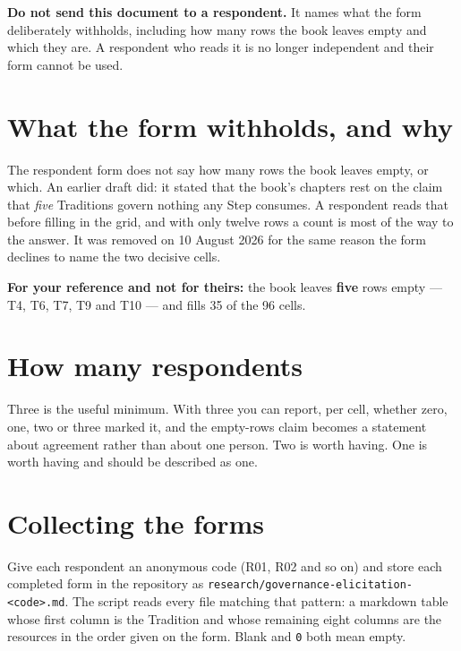 \documentclass[11pt]{article}
\begin{document}

\begin{warning}
\textbf{Do not send this document to a respondent.} It names what the form deliberately withholds,
including how many rows the book leaves empty and which they are. A respondent who reads it is no
longer independent and their form cannot be used.
\end{warning}

\section{What the form withholds, and why}

The respondent form does not say how many rows the book leaves empty, or which. An earlier draft
did: it stated that the book's chapters rest on the claim that \textit{five} Traditions govern
nothing any Step consumes. A respondent reads that before filling in the grid, and with only
twelve rows a count is most of the way to the answer. It was removed on 10 August 2026 for the
same reason the form declines to name the two decisive cells.

\begin{note}
\textbf{For your reference and not for theirs:} the book leaves \textbf{five} rows empty --- T4,
T6, T7, T9 and T10 --- and fills 35 of the 96 cells.
\end{note}

\section{How many respondents}

Three is the useful minimum. With three you can report, per cell, whether zero, one, two or three
marked it, and the empty-rows claim becomes a statement about agreement rather than about one
person. Two is worth having. One is worth having and should be described as one.

\section{Collecting the forms}

Give each respondent an anonymous code (R01, R02 and so on) and store each completed form in the
repository as \texttt{research/governance-\allowbreak elicitation-<code>.md}. The script reads every file matching that pattern: a
markdown table whose first column is the Tradition and whose remaining eight columns are the
resources in the order given on the form. Blank and \texttt{0} both mean empty.
\end{document}
